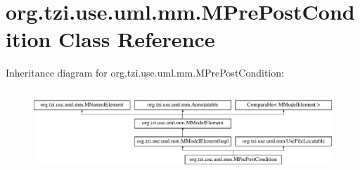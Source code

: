 \hypertarget{classorg_1_1tzi_1_1use_1_1uml_1_1mm_1_1_m_pre_post_condition}{\section{org.\-tzi.\-use.\-uml.\-mm.\-M\-Pre\-Post\-Condition Class Reference}
\label{classorg_1_1tzi_1_1use_1_1uml_1_1mm_1_1_m_pre_post_condition}
}
Inheritance diagram for org.\-tzi.\-use.\-uml.\-mm.\-M\-Pre\-Post\-Condition\-:\begin{figure}[H]
\begin{center}
\leavevmode
\includegraphics[height=3.111111cm]{classorg_1_1tzi_1_1use_1_1uml_1_1mm_1_1_m_pre_post_condition}
\end{center}
\end{figure}
